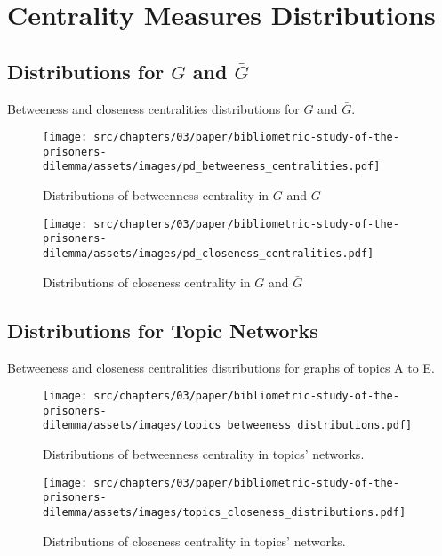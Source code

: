 \chapter{Centrality Measures Distributions}

\section{Distributions for \(G\) and \(\bar{G}\)}

Betweeness and closeness centralities distributions for \(G\) and \(\bar{G}\).

\begin{figure}[!hbtp]
    \centering
    \texttt{[image: src/chapters/03/paper/bibliometric-study-of-the-prisoners-dilemma/assets/images/pd\_betweeness\_centralities.pdf]}
    \caption{Distributions of betweenness centrality in \(G\) and \(\bar{G}\)}
    \label{fig:bc_distributions}
\end{figure}

\begin{figure}[!hbtp]
    \centering
    \texttt{[image: src/chapters/03/paper/bibliometric-study-of-the-prisoners-dilemma/assets/images/pd\_closeness\_centralities.pdf]}
    \caption{Distributions of closeness centrality in \(G\) and \(\bar{G}\)}
    \label{fig:cc_distributions}
\end{figure}

\section{Distributions for Topic Networks}\label{appendix:distributions}

Betweeness and closeness centralities distributions for graphs of topics A to E.

\begin{figure}[!hbtp]
    \centering
    \texttt{[image: src/chapters/03/paper/bibliometric-study-of-the-prisoners-dilemma/assets/images/topics\_betweeness\_distributions.pdf]}
    \caption{Distributions of betweenness centrality in topics' networks.}
    \label{fig:bc_distributions_topics}
\end{figure}

\begin{figure}[!hbtp]
    \centering
    \texttt{[image: src/chapters/03/paper/bibliometric-study-of-the-prisoners-dilemma/assets/images/topics\_closeness\_distributions.pdf]}
    \caption{Distributions of closeness centrality in topics' networks.}
    \label{fig:cc_distributions_topics}
\end{figure}